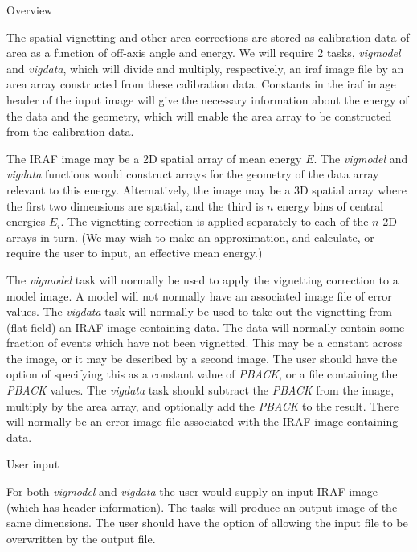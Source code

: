 %
\def\version{Version 1.1 --- 2/2/90}
\def\chapter{Spatial --- Vignetting Corrections}
\@{Overview}

The spatial vignetting and other area corrections are stored as
calibration data of area as a function of off-axis angle and energy.
We will require 2 tasks, {\it vigmodel} and {\it vigdata}, which will divide
and multiply, respectively, an iraf image file
by an area array
constructed from these calibration data. Constants in the iraf image
header of the input image will give the necessary information about
the energy of the data and the geometry, which will enable the area
array to be constructed from the calibration data. 

The IRAF image may be a 2D spatial array of mean energy $E$.
The {\it vigmodel} and {\it vigdata} functions would
construct arrays for the geometry of the data array relevant to this energy.
Alternatively, the image may be a 3D spatial
array where the first two dimensions are spatial, and the third is
$n$ energy bins of central energies $E_i$.  The vignetting correction
is applied
separately to each of the $n$ 2D arrays in turn. (We may wish to make
an approximation, and calculate, or require the user to input, an effective mean energy.)

The {\it vigmodel} task will normally be used to apply the vignetting
correction to a model image.  A model will not normally have an
associated image file of error values.  The {\it vigdata} task will
normally be used to take out the vignetting from (flat-field) an
IRAF image containing data.  The data will
normally contain some fraction of events which have not been vignetted.  This may be a
constant across the image, or it may be described by a second image.
The user should have the option of specifying this as a constant value
of {\it PBACK}, or a file containing the {\it PBACK} values.  The {\it
vigdata} task should subtract the {\it PBACK} from the image, multiply by
the area array, and optionally add the {\it PBACK} to the result.  There will
normally be an error image file associated with the IRAF image
containing data.

\@{User input}

For both {\it vigmodel} and {\it vigdata} the user would supply an
input IRAF image (which has header information).  The tasks will
produce an output image
of the same dimensions.  The user should have the option of allowing
the input file to be overwritten by the output file.

